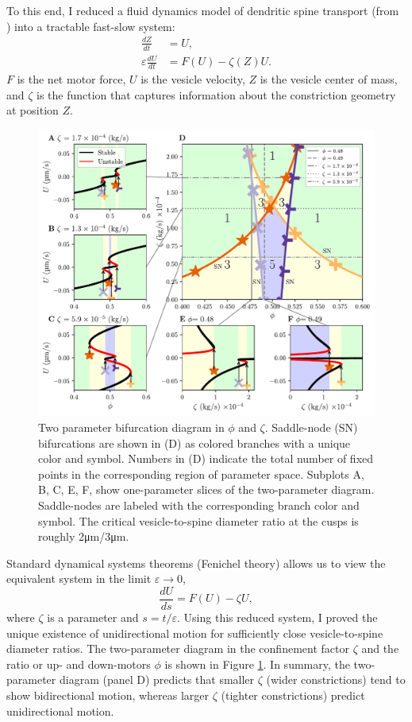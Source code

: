 \documentclass[a4paper,11pt]{article}
\newcommand{\ve}{\varepsilon}
\begin{document}
	To this end, I reduced a fluid dynamics model of dendritic spine transport (from \cite{fai2017active}) into a tractable fast-slow system:
	\begin{equation}\label{eq:fs1}
		\begin{split}
			\frac{dZ}{dt} &= U,\\
			\ve\frac{dU}{dt} &= F(U) - \zeta(Z) U.
		\end{split}
	\end{equation}
	$F$ is the net motor force, $U$ is the vesicle velocity, $Z$ is the vesicle center of mass, and $\zeta$ is the function that captures information about the constriction geometry at position $Z$.
	\begin{figure}[ht!]
		\centering
		\includegraphics[width=\textwidth]{figures/bifurcations_colored.pdf}
		\caption{Two parameter bifurcation diagram in $\phi$ and $\zeta$. Saddle-node (SN) bifurcations are shown in (D) as colored branches with a unique color and symbol. Numbers in (D) indicate the total number of fixed points in the corresponding region of parameter space. Subplots A, B, C, E, F, show one-parameter slices of the two-parameter diagram. Saddle-nodes are labeled with the corresponding branch color and symbol. The critical vesicle-to-spine diameter ratio at the cusps is roughly 2\si{.\um}/3\si{.\um}.}\label{fig:2par}
	\end{figure}
	Standard dynamical systems theorems (Fenichel theory) allows us to view the equivalent system in the limit $\ve\rightarrow 0$,
	\begin{equation*}
		\frac{dU}{ds} = F(U) - \zeta U,
	\end{equation*}
	where $\zeta$ is a parameter and  $s=t/\ve$. Using this reduced system, I proved the unique existence of unidirectional motion for sufficiently close vesicle-to-spine diameter ratios. The two-parameter diagram in the confinement factor $\zeta$ and the ratio or up- and down-motors $\phi$ is shown in Figure \ref{fig:2par}. In summary, the two-parameter diagram (panel D) predicts that smaller $\zeta$ (wider constrictions) tend to show bidirectional motion, whereas larger $\zeta$ (tighter constrictions) predict unidirectional motion.
	
\end{document}
